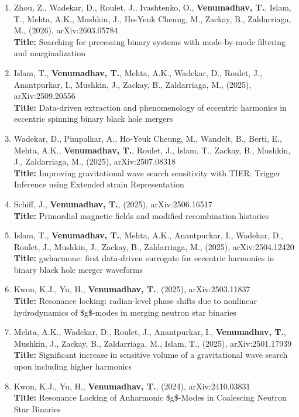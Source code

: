 \documentclass{article}
\begin{document}
{\begin{enumerate}[leftmargin=*,itemsep=0.45em,topsep=0.35em]
\item Zhou, Z., Wadekar, D., Roulet, J., Ivashtenko, O., \textbf{Venumadhav, T.}, Islam, T., Mehta, A.K., Mushkin, J., Ho-Yeuk Cheung, M., Zackay, B., Zaldarriaga, M., (2026), arXiv:2603.05784 \\
\textbf{Title:} Searching for precessing binary systems with mode-by-mode filtering and marginalization
\item Islam, T., \textbf{Venumadhav, T.}, Mehta, A.K., Wadekar, D., Roulet, J., Anantpurkar, I., Mushkin, J., Zackay, B., Zaldarriaga, M., (2025), arXiv:2509.20556 \\
\textbf{Title:} Data-driven extraction and phenomenology of eccentric harmonics in eccentric spinning binary black hole mergers
\item Wadekar, D., Pimpalkar, A., Ho-Yeuk Cheung, M., Wandelt, B., Berti, E., Mehta, A.K., \textbf{Venumadhav, T.}, Roulet, J., Islam, T., Zackay, B., Mushkin, J., Zaldarriaga, M., (2025), arXiv:2507.08318 \\
\textbf{Title:} Improving gravitational wave search sensitivity with TIER: Trigger Inference using Extended strain Representation
\item Schiff, J., \textbf{Venumadhav, T.}, (2025), arXiv:2506.16517 \\
\textbf{Title:} Primordial magnetic fields and modified recombination histories
\item Islam, T., \textbf{Venumadhav, T.}, Mehta, A.K., Anantpurkar, I., Wadekar, D., Roulet, J., Mushkin, J., Zackay, B., Zaldarriaga, M., (2025), arXiv:2504.12420 \\
\textbf{Title:} gwharmone: first data-driven surrogate for eccentric harmonics in binary black hole merger waveforms
\item Kwon, K.J., Yu, H., \textbf{Venumadhav, T.}, (2025), arXiv:2503.11837 \\
\textbf{Title:} Resonance locking: radian-level phase shifts due to nonlinear hydrodynamics of \$g\$-modes in merging neutron star binaries
\item Mehta, A.K., Wadekar, D., Roulet, J., Anantpurkar, I., \textbf{Venumadhav, T.}, Mushkin, J., Zackay, B., Zaldarriaga, M., Islam, T., (2025), arXiv:2501.17939 \\
\textbf{Title:} Significant increase in sensitive volume of a gravitational wave search upon including higher harmonics
\item Kwon, K.J., Yu, H., \textbf{Venumadhav, T.}, (2024), arXiv:2410.03831 \\
\textbf{Title:} Resonance Locking of Anharmonic \$g\$-Modes in Coalescing Neutron Star Binaries

\end{enumerate}}
\end{document}
